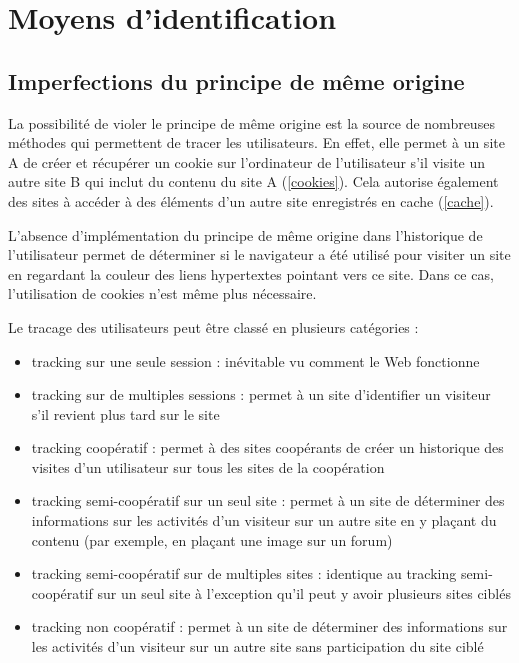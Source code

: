 \chapter{Moyens d'identification}
\section{Imperfections du principe de même origine}
La possibilité de violer le principe de même origine est la source de nombreuses méthodes qui permettent de tracer les utilisateurs.
En effet, elle permet à un site A de créer et récupérer un cookie sur l'ordinateur de l'utilisateur s'il visite un autre site B qui inclut du contenu du site A (\autoref{cookies}). Cela autorise également des sites à accéder à des éléments d'un autre site enregistrés en cache (\autoref{cache}).

L'absence d'implémentation du principe de même origine dans l'historique de l'utilisateur permet de déterminer si le navigateur a été utilisé pour visiter un site en regardant la couleur des liens hypertextes pointant vers ce site. Dans ce cas, l'utilisation de cookies n'est même plus nécessaire.
\newline

Le tracage des utilisateurs peut être classé en plusieurs catégories \cite{Jackson:2006:PBS:1135777.1135884} :
\begin{itemize}
  \item tracking sur une seule session : inévitable vu comment le Web fonctionne
  \item tracking sur de multiples sessions : permet à un site d'identifier un visiteur s'il revient plus tard sur le site
  \item tracking coopératif : permet à des sites coopérants de créer un historique des visites d'un utilisateur sur tous les sites de la coopération
  \item tracking semi-coopératif sur un seul site : permet à un site de déterminer des informations sur les activités d'un visiteur sur un autre site en y plaçant du contenu (par exemple, en plaçant une image sur un forum)
  \item tracking semi-coopératif sur de multiples sites : identique au tracking semi-coopératif sur un seul site à l'exception qu'il peut y avoir plusieurs sites ciblés
  \item tracking non coopératif : permet à un site de déterminer des informations sur les activités d'un visiteur sur un autre site sans participation du site ciblé
  \newline
\end{itemize}

